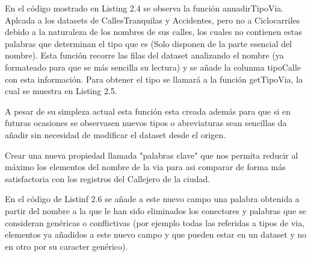 En el código mostrado en Listing 2.4 se observa la función annadirTipoVia. Aplcada a los datasets de CallesTranquilas y Accidentes, pero no a Ciclocarriles debido a la naturaleza de los nombres de sus calles, los cuales no contienen estas palabras que determinan el tipo que es (Solo disponen de la parte esencial del nombre).
\newline
Esta función recorre las filas del dataset analizando el nombre (ya formateado para que se más sencilla su lectura) y se añade la colunma tipoCalle con esta información. Para obtener el tipo se llamará a la función getTipoVia, la cual se muestra en Listing 2.5.
\newline

       
       
A pesar de su simpleza actual esta función esta creada además para que si en futuras ocasiones se observasen nuevos tipos o abreviaturas sean sencillas da añadir sin necesidad de modificar el dataset desde el origen.
\newline
      
    \item Crear una nueva propiedad llamada "palabras clave" que nos permita reducir al máximo los elementos del nombre de la via para asi comparar de forma más satisfactoria con los registros del Callejero de la ciudad.
    
      
    
En el código de Listinf 2.6 se añade a este nuevo campo una palabra obtenida a partir del nombre a la que le han sido eliminados los conectores y palabras que se consideran genéricas o conflictivas (por ejemplo todas las referidas a tipos de via, elementos ya añadidos a este nuevo campo y que pueden estar en un dataset y no en otro por su caracter genérico).

      
    
      
      

